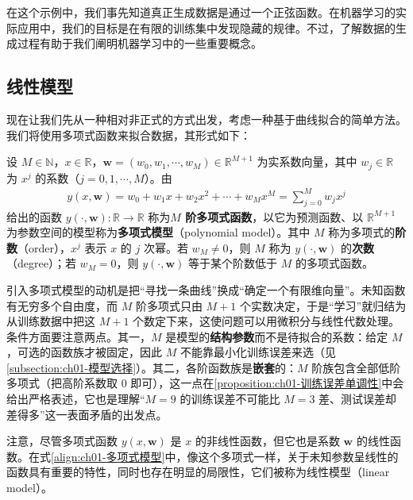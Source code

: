 \documentclass[../../main.tex]{subfiles}
\begin{document}
在这个示例中，我们事先知道真正生成数据是通过一个正弦函数。在机器学习的实际应用中，我们的目标是在有限的训练集中发现隐藏的规律。不过，了解数据的生成过程有助于我们阐明机器学习中的一些重要概念。

\subsection{线性模型}\label{subsection:ch01-线性模型}

现在让我们先从一种相对非正式的方式出发，考虑一种基于曲线拟合的简单方法。我们将使用多项式函数来拟合数据，其形式如下：

\begin{definition}[多项式模型]\label{definition:ch01-多项式模型}
设 $M\in\mathbb{N}$，$x\in\mathbb{R}$，$\mathbf{w}=(w_0,w_1,\cdots,w_M)\in\mathbb{R}^{M+1}$ 为实系数向量，其中 $w_j\in\mathbb{R}$ 为 $x^{j}$ 的系数（$j=0,1,\cdots,M$）。由
\begin{align}
  y(x,\mathbf{w}) = w_0 + w_1 x + w_2 x^2 + \cdots + w_M x^M = \sum_{j=0}^{M} w_j x^j
  \label{align:ch01-多项式模型}
\end{align}
给出的函数 $y(\cdot,\mathbf{w}):\mathbb{R}\to\mathbb{R}$ 称为\textbf{$M$ 阶多项式函数}，以它为预测函数、以 $\mathbb{R}^{M+1}$ 为参数空间的模型称为\textbf{多项式模型}（polynomial model）。其中 $M$ 称为多项式的\textbf{阶数}（order），$x^{j}$ 表示 $x$ 的 $j$ 次幂。若 $w_M\neq0$，则 $M$ 称为 $y(\cdot,\mathbf{w})$ 的\textbf{次数}（degree）；若 $w_M=0$，则 $y(\cdot,\mathbf{w})$ 等于某个阶数低于 $M$ 的多项式函数。
\end{definition}

\begin{remark}
引入多项式模型的动机是把“寻找一条曲线”换成“确定一个有限维向量”。未知函数有无穷多个自由度，而 $M$ 阶多项式只由 $M+1$ 个实数决定，于是“学习”就归结为从训练数据中把这 $M+1$ 个数定下来，这使问题可以用微积分与线性代数处理。
条件方面要注意两点。其一，$M$ 是模型的\textbf{结构参数}而不是待拟合的系数：给定 $M$，可选的函数族才被固定，因此 $M$ 不能靠最小化训练误差来选（见\cref{subsection:ch01-模型选择}）。其二，各阶函数族是\textbf{嵌套}的：$M$ 阶族包含全部低阶多项式（把高阶系数取 $0$ 即可），这一点在\cref{proposition:ch01-训练误差单调性}中会给出严格表述，它也是理解“$M=9$ 的训练误差不可能比 $M=3$ 差、测试误差却差得多”这一表面矛盾的出发点。
\end{remark}

注意，尽管多项式函数 $y(x,\mathbf{w})$ 是 $x$ 的非线性函数，但它也是系数 $\mathbf{w}$ 的线性函数。在式\eqref{align:ch01-多项式模型}中，像这个多项式一样，关于未知参数呈线性的函数具有重要的特性，同时也存在明显的局限性，它们被称为线性模型（linear model）。
\end{document}
